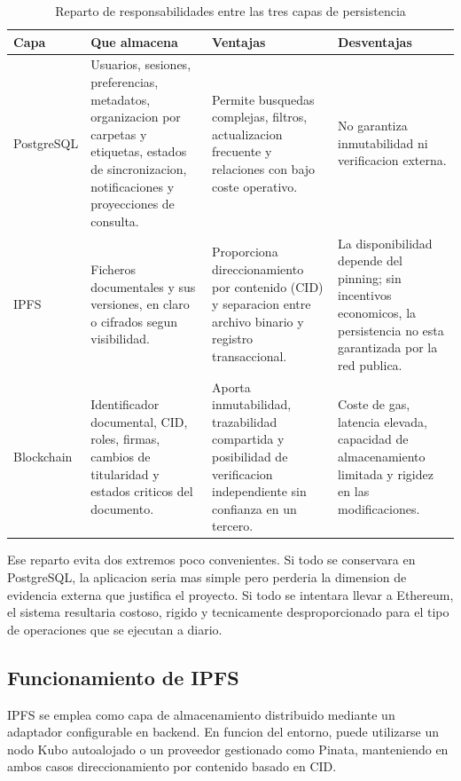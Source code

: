 \documentclass[11pt, a4paper]{article}
\begin{document}
\begin{table}[H]
    \centering
    \small
    \renewcommand{\arraystretch}{1.4}
    \begin{tabular}{@{}p{2.8cm}p{4.2cm}p{4.2cm}p{3.5cm}@{}}
    \toprule
    \textbf{Capa} & \textbf{Que almacena} & \textbf{Ventajas} & \textbf{Desventajas} \\
    \midrule
    PostgreSQL & Usuarios, sesiones, preferencias, metadatos, organizacion por carpetas y etiquetas, estados de sincronizacion, notificaciones y proyecciones de consulta. & Permite busquedas complejas, filtros, actualizacion frecuente y relaciones con bajo coste operativo. & No garantiza inmutabilidad ni verificacion externa. \\
    \addlinespace
    IPFS & Ficheros documentales y sus versiones, en claro o cifrados segun visibilidad. & Proporciona direccionamiento por contenido (CID) y separacion entre archivo binario y registro transaccional. & La disponibilidad depende del pinning; sin incentivos economicos, la persistencia no esta garantizada por la red publica. \\
    \addlinespace
    Blockchain & Identificador documental, CID, roles, firmas, cambios de titularidad y estados criticos del documento. & Aporta inmutabilidad, trazabilidad compartida y posibilidad de verificacion independiente sin confianza en un tercero. & Coste de gas, latencia elevada, capacidad de almacenamiento limitada y rigidez en las modificaciones. \\
    \bottomrule
    \end{tabular}
    \caption{Reparto de responsabilidades entre las tres capas de persistencia}
    \label{tab:capas-persistencia}
\end{table}

Ese reparto evita dos extremos poco convenientes. Si todo se conservara en PostgreSQL, la aplicacion seria mas simple pero perderia la dimension de evidencia externa que justifica el proyecto. Si todo se intentara llevar a Ethereum, el sistema resultaria costoso, rigido y tecnicamente desproporcionado para el tipo de operaciones que se ejecutan a diario.

\subsection{Funcionamiento de IPFS}

IPFS se emplea como capa de almacenamiento distribuido mediante un adaptador configurable en backend. En funcion del entorno, puede utilizarse un nodo Kubo autoalojado o un proveedor gestionado como Pinata, manteniendo en ambos casos direccionamiento por contenido basado en CID.
\end{document}
